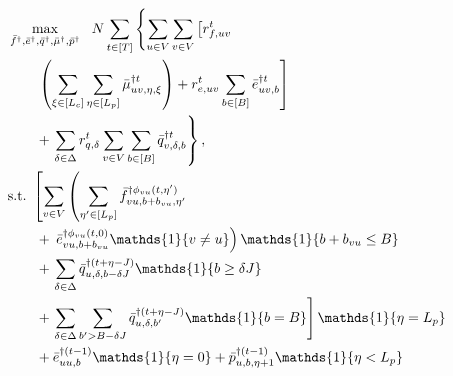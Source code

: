 \allowdisplaybreaks
{\small \begin{subequations} \label{eq:fluid-lp}
\begin{align}
    &\max_{\lpredtripfulfill{}{}, \lpredreroute{}{}, \lpredcharge{}{}, \lpredslack{}{}, \lpredpass{}{}} \  \  \Size \sum_{\time \in [\Horizon]}^{} \left\{ \sum_{\origin \in \Region} \sum_{\destination \in \Region} \left[ \tripfulfillreward{,\origin\destination}{\time} \right. \right. \nonumber \\
    &\qquad \left. \left(\sum_{\tripactivetime \in [\Lc]}^{}\sum_{\timetoarrival \in [\Lp]}^{} \lpredslack{\origin \destination, \timetoarrival, \tripactivetime}{\time} \right) + \reroutingreward{,\origin\destination}{\time} \sum_{\battery \in [\range]}^{} \lpredreroute{\origin \destination, \battery}{\time} \right] \nonumber\\ 
    &\qquad+ \left. \sum_{\type \in \Type} \chargingreward{,\type}{\time} \sum_{\region \in \Region} \sum_{\battery \in [\range]}^{} \lpredcharge{\region, \type, \battery}{\time} \right\}, \notag \\%
    &\text{s.t.} \  \left[ \sum_{\destination \in \Region} \left( \sum_{\timetoarrival' \in [\Lp]}^{} \lpredtripfulfill{\destination \origin, \battery + \batterycost{\destination \origin}, \timetoarrival'}{\phi_{\destination \origin}(t, \timetoarrival')} \nonumber \right. \right.\\ 
    &\qquad+ \left. \left. \lpredreroute{\destination \origin, \battery + \batterycost{\destination \origin}}{\phi_{\destination \origin}(t, 0)} \mathds{1}\{\destination \neq \origin\} \right) \mathds{1}\{\battery + \batterycost{\destination \origin} \leq \range \} \right. \nonumber \\
    &\qquad+ \left. \sum_{\type \in \Type} \lpredcharge{\origin, \type, \battery - \type \chargetime}{(\time + \timetoarrival - \chargetime)} \mathds{1}\{\battery \geq \type \chargetime\} \right. \notag\\ 
    &\qquad+ \left. \sum_{\type \in \Type} \sum_{\battery' > \range - \type \chargetime} \lpredcharge{\origin, \type, \battery'}{(\time + \timetoarrival - \chargetime)} \mathds{1}\{\battery = \range\} \right] \mathds{1}\{\timetoarrival = \Lp\} \nonumber\\ 
    &\qquad+ \lpredreroute{\origin \origin, \battery}{(\time - 1)} \mathds{1}\{\timetoarrival = 0\} + \lpredpass{\origin, \battery, \timetoarrival + 1}{(\time - 1)} \mathds{1}\{\timetoarrival < \Lp\} \notag \\

\end{align}
\end{subequations}}
